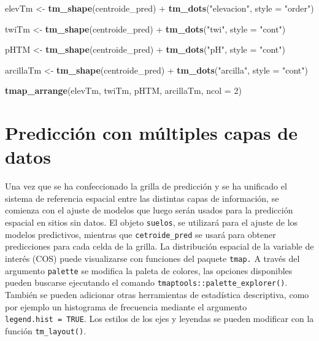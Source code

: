 \documentclass[11pt,b5paper,]{krantz}
\newenvironment{Shaded}{}{}
\newcommand{\DataTypeTok}[1]{\textcolor[rgb]{0.56,0.13,0.00}{#1}}
\newcommand{\DecValTok}[1]{\textcolor[rgb]{0.25,0.63,0.44}{#1}}
\newcommand{\KeywordTok}[1]{\textcolor[rgb]{0.00,0.44,0.13}{\textbf{#1}}}
\newcommand{\NormalTok}[1]{#1}
\newcommand{\OperatorTok}[1]{\textcolor[rgb]{0.40,0.40,0.40}{#1}}
\newcommand{\StringTok}[1]{\textcolor[rgb]{0.25,0.44,0.63}{#1}}
\begin{document}
\begin{Shaded}
\begin{Highlighting}[]
\NormalTok{elevTm <-}\StringTok{ }\KeywordTok{tm_shape}\NormalTok{(centroide_pred) }\OperatorTok{+}
\StringTok{  }\KeywordTok{tm_dots}\NormalTok{(}\StringTok{"elevacion"}\NormalTok{, }\DataTypeTok{style =} \StringTok{"order"}\NormalTok{)}

\NormalTok{twiTm <-}\StringTok{ }\KeywordTok{tm_shape}\NormalTok{(centroide_pred) }\OperatorTok{+}
\StringTok{  }\KeywordTok{tm_dots}\NormalTok{(}\StringTok{"twi"}\NormalTok{, }\DataTypeTok{style =} \StringTok{"cont"}\NormalTok{)}

\NormalTok{pHTM <-}\StringTok{ }\KeywordTok{tm_shape}\NormalTok{(centroide_pred) }\OperatorTok{+}
\StringTok{  }\KeywordTok{tm_dots}\NormalTok{(}\StringTok{"pH"}\NormalTok{, }\DataTypeTok{style =} \StringTok{"cont"}\NormalTok{)}

\NormalTok{arcillaTm <-}\StringTok{ }\KeywordTok{tm_shape}\NormalTok{(centroide_pred) }\OperatorTok{+}
\StringTok{  }\KeywordTok{tm_dots}\NormalTok{(}\StringTok{"arcilla"}\NormalTok{, }\DataTypeTok{style =} \StringTok{"cont"}\NormalTok{)}

\KeywordTok{tmap_arrange}\NormalTok{(elevTm, twiTm, pHTM, arcillaTm, }
             \DataTypeTok{ncol =} \DecValTok{2}\NormalTok{)}
\end{Highlighting}
\end{Shaded}

\hypertarget{htmlwidget-2339}{}

\hypertarget{htmlwidget-3624}{}

\hypertarget{htmlwidget-1190}{}

\hypertarget{htmlwidget-2237}{}

\hypertarget{predicciuxf3n-con-muxfaltiples-capas-de-datos-3}{%
\chapter{Predicción con múltiples capas de datos}\label{predicciuxf3n-con-muxfaltiples-capas-de-datos-3}}

Una vez que se ha confeccionado la grilla de predicción y se ha unificado el sistema de referencia espacial entre las distintas capas de información, se comienza con el ajuste de modelos que luego serán usados para la predicción espacial en sitios sin datos. El objeto \texttt{suelos}, se utilizará para el ajuste de los modelos predictivos, mientras que \texttt{cetroide\_pred} se usará para obtener predicciones para cada celda de la grilla.
La distribución espacial de la variable de interés (COS) puede visualizarse con funciones del paquete \texttt{tmap.} A través del argumento \texttt{palette} se modifica la paleta de colores, las opciones disponibles pueden buscarse ejecutando el comando \texttt{tmaptools::palette\_explorer()}. También se pueden adicionar otras herramientas de estadística descriptiva, como por ejemplo un histograma de frecuencia mediante el argumento \texttt{legend.hist\ =\ TRUE}. Los estilos de los ejes y leyendas se pueden modificar con la función \texttt{tm\_layout()}.
\end{document}

